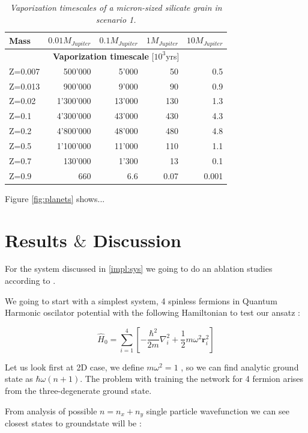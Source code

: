 \documentclass[a4paper,11pt,twoside]{article}
\begin{document}
\begin{table}[H]
    \centering
    \begin{tabular}{|l||r|r|r|r|}
    \hline
     Mass & $0.01M_{Jupiter}$ & $0.1M_{Jupiter}$& $1M_{Jupiter}$& $10M_{Jupiter}$\\
     \hline
    \hline
    \multicolumn{5}{|c|}{ \textbf{Vaporization timescale} [$10^3$yrs]}\\
    \hline
    \hline
   Z=0.007 &500'000&5'000&50&0.5\\
   Z=0.013 &900'000&9'000&90&0.9\\
   Z=0.02 & 1'300'000&13'000&130&1.3\\
   Z=0.1 & 4'300'000&43'000&430&4.3\\
   Z=0.2 & 4'800'000&48'000&480&4.8\\
   Z=0.5 & 1'100'000&11'000&110&1.1\\
   Z=0.7 & 130'000&1'300&13&0.1\\
   Z=0.9 & 660&6.6&0.07& 0.001\\
     \hline
\end{tabular}
 \caption[Short Caption Table 2]{\textit{Vaporization timescales of a micron-sized silicate grain in scenario 1. } }
 \label{tab:vap}
\end{table}
Figure \ref{fig:planets} shows...


\newpage

\section{Results $\&$ Discussion}

For the system discussed in \ref{impl:sys} we going to do an ablation studies according to \cite{godbole_deep_2023}. 


We going to start with a simplest system, 4 spinless fermions in Quantum Harmonic oscilator potential with the following Hamiltonian to test our ansatz : 

\begin{equation}
\hat{H}_0
=
\sum_{i=1}^{4}
\left[
    -\frac{\hbar^{2}}{2m}\nabla_i^{2}
    + \frac{1}{2} m \omega^{2} \mathbf r_i^{2}
\right]
\end{equation}

Let us look first at 2D case, we define $ m  \omega^2 = 1  $ , so we can find analytic ground state as $ \hbar \omega ( n + 1 )  $. The problem with training the network for 4 fermion arises from the three-degenerate ground state. 


From analysis of possible $n = n_x + n_y$ single particle wavefunction we can see closest states to groundstate will be : 
\end{document}
